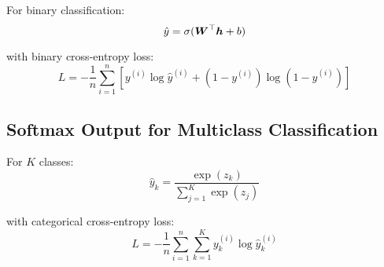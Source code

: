 For binary classification:
\begin{equation}
\hat{y} = \sigma(\boldsymbol{W}^\top \boldsymbol{h} + b)
\end{equation}

with binary cross-entropy loss:
\begin{equation}
L = -\frac{1}{n} \sum_{i=1}^{n} [y^{(i)} \log \hat{y}^{(i)} + (1-y^{(i)}) \log(1-\hat{y}^{(i)})]
\end{equation}

\subsection{Softmax Output for Multiclass Classification}

For $K$ classes:
\begin{equation}
\hat{y}_k = \frac{\exp(z_k)}{\sum_{j=1}^{K} \exp(z_j)}
\end{equation}

with categorical cross-entropy loss:
\begin{equation}
L = -\frac{1}{n} \sum_{i=1}^{n} \sum_{k=1}^{K} y_k^{(i)} \log \hat{y}_k^{(i)}
\end{equation}


